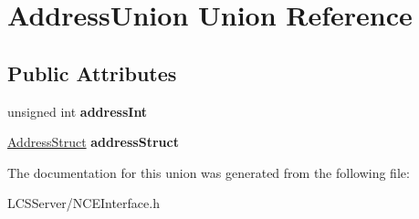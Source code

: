 \hypertarget{union_address_union}{}\section{Address\+Union Union Reference}
\label{union_address_union}
\subsection*{Public Attributes}
\begin{DoxyCompactItemize}
\item 
\mbox{\label{union_address_union_ab5b9022a3c4e4de300601e2d33c81159}} 
unsigned int {\bfseries address\+Int}
\item 
\mbox{\label{union_address_union_a5334b10767b37cb8640b5de9028b8103}} 
\hyperlink{struct_address_struct}{Address\+Struct} {\bfseries address\+Struct}
\end{DoxyCompactItemize}


The documentation for this union was generated from the following file\+:\begin{DoxyCompactItemize}
\item 
L\+C\+S\+Server/N\+C\+E\+Interface.\+h\end{DoxyCompactItemize}
